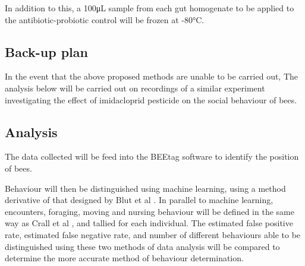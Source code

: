 \documentclass[11pt]{article}
\begin{document}
            In addition to this, a 100\si{\micro\liter} sample from each gut homogenate to be applied to the antibiotic-probiotic control will be frozen at \ang{-80}C.
            
        \subsection{Back-up plan}
        In the event that the above proposed methods are unable to be carried out,
        The analysis below will be carried out on recordings of a similar experiment investigating the effect of imidacloprid pesticide on the social behaviour of bees.
 
        \subsection{Analysis}
            The data collected will be feed into the BEEtag software
            \cite{crall2015beetag} to identify the position of bees.
            
            Behaviour will then be distinguished using machine learning,
            using a method derivative of that designed by Blut et al
            \cite{blut2017automated}.
            In parallel to machine learning,
            encounters, foraging, moving and nursing behaviour will be defined in the same way as Crall et al
            \cite{crall2018neonicotinoid},
            and tallied for each individual.
            The estimated false positive rate, estimated false negative rate,
            and number of different behaviours able to be distinguished using these two methods of data analysis will be compared to determine the more accurate method of behaviour determination.
            
\end{document}
